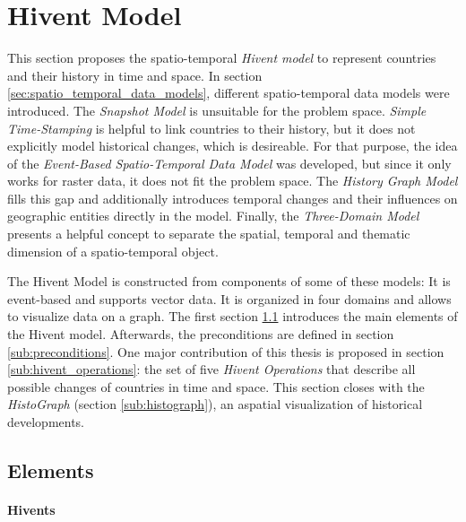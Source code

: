 
\section{Hivent Model} %
\label{sec:hivent_model}

This section proposes the spatio-temporal \emph{Hivent model} to represent countries and their history in time and space. In section \ref{sec:spatio_temporal_data_models}, different spatio-temporal data models were introduced. The \emph{Snapshot Model} is unsuitable for the problem space. \emph{Simple Time-Stamping} is helpful to link countries to their history, but it does not explicitly model historical changes, which is desireable. For that purpose, the idea of the \emph{Event-Based Spatio-Temporal Data Model} was developed, but since it only works for raster data, it does not fit the problem space. The \emph{History Graph Model} fills this gap and additionally introduces temporal changes and their influences on geographic entities directly in the model. Finally, the \emph{Three-Domain Model} presents a helpful concept to separate the spatial, temporal and thematic dimension of a spatio-temporal object.

The Hivent Model is constructed from components of some of these models: It is event-based and supports vector data. It is organized in four domains and allows to visualize data on a graph. The first section \ref{sub:elements} introduces the main elements of the Hivent model. Afterwards, the preconditions are defined in section \ref{sub:preconditions}. One major contribution of this thesis is proposed in section \ref{sub:hivent_operations}: the set of five \emph{Hivent Operations} that describe all possible changes of countries in time and space. This section closes with the \emph{HistoGraph} (section \ref{sub:histograph}), an aspatial visualization of historical developments.

\subsection{Elements} %
\label{sub:elements}

\vspace{-1em}
\paragraph{Hivents} %
\label{par:hivent}

